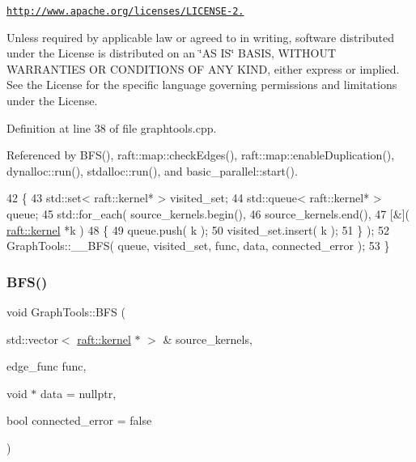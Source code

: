 \href{http://www.apache.org/licenses/LICENSE-2.0}{\tt http\+://www.\+apache.\+org/licenses/\+L\+I\+C\+E\+N\+S\+E-\/2.}

Unless required by applicable law or agreed to in writing, software distributed under the License is distributed on an \char`\"{}\+A\+S I\+S\char`\"{} B\+A\+S\+IS, W\+I\+T\+H\+O\+UT W\+A\+R\+R\+A\+N\+T\+I\+ES OR C\+O\+N\+D\+I\+T\+I\+O\+NS OF A\+NY K\+I\+ND, either express or implied. See the License for the specific language governing permissions and limitations under the License. 

Definition at line 38 of file graphtools.\+cpp.



Referenced by B\+F\+S(), raft\+::map\+::check\+Edges(), raft\+::map\+::enable\+Duplication(), dynalloc\+::run(), stdalloc\+::run(), and basic\+\_\+parallel\+::start().


\begin{DoxyCode}
42 \{
43    std::set< raft::kernel* > visited\_set;
44    std::queue< raft::kernel* >     queue;
45    std::for\_each( source\_kernels.begin(),
46                   source\_kernels.end(),
47                   [&]( \hyperlink{classraft_1_1kernel}{raft::kernel} *k )
48                   \{
49                      queue.push( k );
50                      visited\_set.insert( k );
51                   \} );
52    GraphTools::\_\_BFS( queue, visited\_set, func, data, connected\_error );
53 \}
\end{DoxyCode}
\hypertarget{class_graph_tools_afc9c2852a351fe8b1a881b5d8b6c97f5}{}\label{class_graph_tools_afc9c2852a351fe8b1a881b5d8b6c97f5} 
\subsubsection{\texorpdfstring{B\+F\+S()}{BFS()}\hspace{0.1cm}{\footnotesize\ttfamily [2/2]}}
{\footnotesize\ttfamily void Graph\+Tools\+::\+B\+FS (\begin{DoxyParamCaption}\item[{std\+::vector$<$ \hyperlink{classraft_1_1kernel}{raft\+::kernel} $\ast$ $>$ \&}]{source\+\_\+kernels,  }\item[{edge\+\_\+func}]{func,  }\item[{void $\ast$}]{data = {\ttfamily nullptr},  }\item[{bool}]{connected\+\_\+error = {\ttfamily false} }\end{DoxyParamCaption})\hspace{0.3cm}{\ttfamily [static]}}

